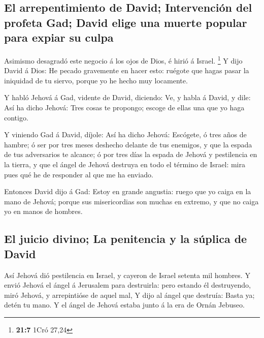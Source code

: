 \hypertarget{el-arrepentimiento-de-david-intervenciuxf3n-del-profeta-gad-david-elige-una-muerte-popular-para-expiar-su-culpa}{%
\subsection{El arrepentimiento de David; Intervención del profeta Gad;
David elige una muerte popular para expiar su
culpa}\label{el-arrepentimiento-de-david-intervenciuxf3n-del-profeta-gad-david-elige-una-muerte-popular-para-expiar-su-culpa}}

 Asimismo desagradó este negocio á los ojos de Dios, é
hirió á Israel. \footnote{\textbf{21:7} 1Cró 27,24}  Y
dijo David á Dios: He pecado gravemente en hacer esto: ruégote que hagas
pasar la iniquidad de tu siervo, porque yo he hecho muy locamente.

 Y habló Jehová á Gad, vidente de David, diciendo:
 Ve, y habla á David, y dile: Así ha dicho Jehová: Tres
cosas te propongo; escoge de ellas una que yo haga contigo.

 Y viniendo Gad á David, díjole: Así ha dicho Jehová:
 Escógete, ó tres años de hambre; ó ser por tres meses
deshecho delante de tus enemigos, y que la espada de tus adversarios te
alcance; ó por tres días la espada de Jehová y pestilencia en la tierra,
y que el ángel de Jehová destruya en todo el término de Israel: mira
pues qué he de responder al que me ha enviado.

 Entonces David dijo á Gad: Estoy en grande angustia:
ruego que yo caiga en la mano de Jehová; porque sus misericordias son
muchas en extremo, y que no caiga yo en manos de hombres.

\hypertarget{el-juicio-divino-la-penitencia-y-la-suxfaplica-de-david}{%
\subsection{El juicio divino; La penitencia y la súplica de
David}\label{el-juicio-divino-la-penitencia-y-la-suxfaplica-de-david}}

 Así Jehová dió pestilencia en Israel, y cayeron de
Israel setenta mil hombres.  Y envió Jehová el ángel á
Jerusalem para destruirla: pero estando él destruyendo, miró Jehová, y
arrepintióse de aquel mal,  Y dijo al ángel que destruía:
Basta ya; detén tu mano. Y el ángel de Jehová estaba junto á la era de
Ornán Jebuseo.

